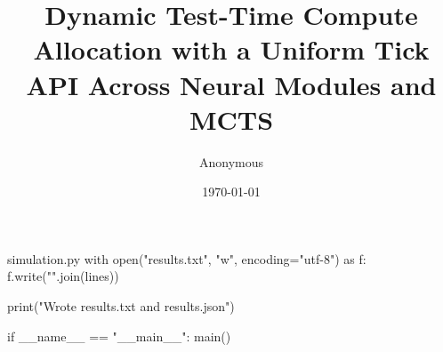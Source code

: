 \begin{filecontents*}{simulation.py}
    with open("results.txt", "w", encoding="utf-8") as f:
        f.write("\n".join(lines))

    print("Wrote results.txt and results.json")


if __name__ == "__main__":
    main()
\end{filecontents*}
\documentclass[10pt]{article}

\usepackage[margin=1in]{geometry}
\usepackage{microtype}
\usepackage{booktabs}
\usepackage{amsmath, amssymb, mathtools, bm}
\usepackage[dvipsnames]{xcolor}
\usepackage{float}
\usepackage{caption}
\usepackage{url}
\usepackage{hyperref}
\usepackage{enumitem}
\usepackage{adjustbox}
\usepackage[ruled,vlined,linesnumbered]{algorithm2e}
\usepackage{tikz}
\usepackage{pgfplots}
\pgfplotsset{compat=1.18}

\hypersetup{
  colorlinks=true,
  linkcolor=MidnightBlue,
  citecolor=MidnightBlue,
  urlcolor=MidnightBlue
}

\newcommand{\E}{\mathbb{E}}
\newcommand{\KL}{\mathrm{KL}}
\newcommand{\Var}{\mathrm{Var}}
\newcommand{\softmax}{\mathrm{softmax}}
\newcommand{\entropy}{\mathcal{H}}
\newcommand{\marginGap}{\Delta}
\newcommand{\tick}{\textsf{tick}}
\newcommand{\TickAPI}{\textsc{Tick-API}}
\newcommand{\model}{\textsc{Net}}
\newcommand{\budget}{\mathcal{B}}
\newcommand{\cost}{\mathsf{cost}}
\newcommand{\gain}{\widehat{\Delta}}

\title{\vspace{-0.25em}\textbf{Dynamic Test-Time Compute Allocation with a Uniform Tick API Across Neural Modules and MCTS}\vspace{0.25em}}
\author{Anonymous}
\date{\today}


\maketitle

\begin{abstract}
We present a compact, reproducible framework for dynamic test-time compute allocation that applies uniformly across neural modules and Monte Carlo Tree Search (MCTS). The key idea is a simple uniform compute unit (\TickAPI) that exposes three methods: one\_tick (spend one unit of compute), uncertainty (how much more compute could help), and output (current prediction). We instantiate the framework in four experiments: (E1) early-exit classification; (E2) intra-network multi-head scheduling; (E3) adaptive sequential sampling; and (E4) MCTS with an adaptive stopping rule---all using the same scheduling logic. Our artifact provides full traceability: a single simulation.py writes results.txt and results.json with every number plotted or tabulated in this paper, including correctness counts, binomial and Wilson 95\% intervals, derived parameters, McNemar paired tests (E2), effect sizes (accuracy differences vs baselines) with 95\% CIs (E3/E4), and a results\_version string. We also refine the methodology by reporting effect sizes with uncertainty and by clarifying the statistical testing and calibration options within our price-based scheduling framework.
\end{abstract}

